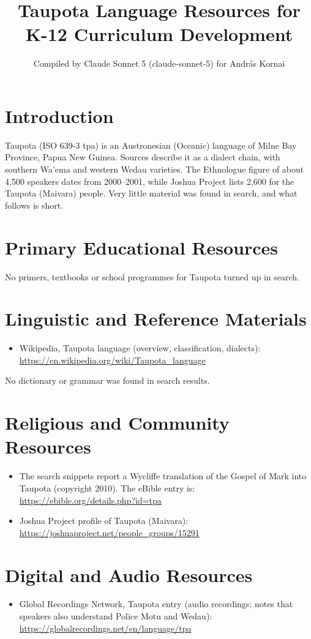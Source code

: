 \documentclass[12pt]{article}
\title{Taupota Language Resources for K-12 Curriculum Development}
\author{Compiled by Claude Sonnet 5 (claude-sonnet-5) for Andr\'as Kornai}
\date{}
\begin{document}
\maketitle

\section{Introduction}
Taupota (ISO 639-3 tpa) is an Austronesian (Oceanic) language of Milne Bay Province, Papua New Guinea. Sources describe it as a dialect chain, with southern Wa'ema and western Wedau varieties. The Ethnologue figure of about 4,500 speakers dates from 2000--2001, while Joshua Project lists 2,600 for the Taupota (Maivara) people. Very little material was found in search, and what follows is short.

\section{Primary Educational Resources}
No primers, textbooks or school programmes for Taupota turned up in search.

\section{Linguistic and Reference Materials}
\begin{itemize}
\item Wikipedia, Taupota language (overview, classification, dialects): \url{https://en.wikipedia.org/wiki/Taupota_language}
\end{itemize}
No dictionary or grammar was found in search results.

\section{Religious and Community Resources}
\begin{itemize}
\item The search snippets report a Wycliffe translation of the Gospel of Mark into Taupota (copyright 2010). The eBible entry is: \url{https://ebible.org/details.php?id=tpa}
\item Joshua Project profile of Taupota (Maivara): \url{https://joshuaproject.net/people_groups/15291}
\end{itemize}

\section{Digital and Audio Resources}
\begin{itemize}
\item Global Recordings Network, Taupota entry (audio recordings; notes that speakers also understand Police Motu and Wedau): \url{https://globalrecordings.net/en/language/tpa}
\end{itemize}
\end{document}
